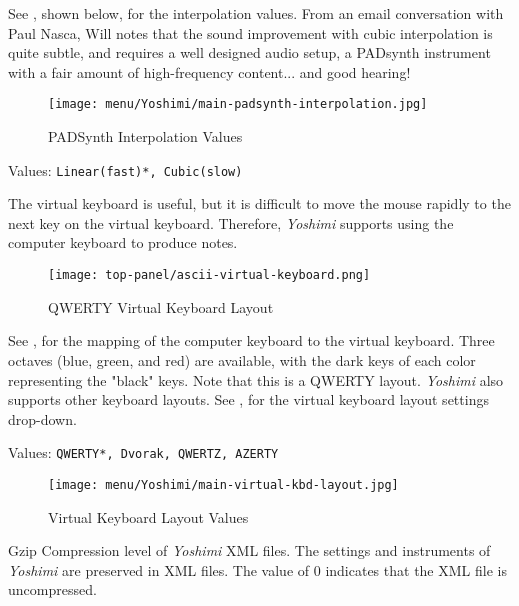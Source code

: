    See , shown below,
   for the interpolation values.
   From an email conversation with Paul Nasca, Will notes that
   the sound improvement with cubic interpolation is quite subtle, and requires
   a well designed audio setup, a PADsynth instrument with a fair amount of
   high-frequency content... and good hearing!

\begin{figure}[H]
   \centering
   \texttt{[image: menu/Yoshimi/main-padsynth-interpolation.jpg]}
   \caption[PADSynth Interpolation]{PADSynth Interpolation Values}
   \label{fig:padsynth_interpolation}
\end{figure}

   Values: \texttt{Linear(fast)*, Cubic(slow)}

   The virtual keyboard is useful, but it is difficult to move the mouse
   rapidly to the next key on the virtual keyboard.
   Therefore, \textsl{Yoshimi} supports using the computer keyboard
   to produce notes.

\begin{figure}[H]
   \centering
   \texttt{[image: top-panel/ascii-virtual-keyboard.png]}
   \caption{QWERTY Virtual Keyboard Layout}
   \label{fig:qwerty_virtual_keyboard}
\end{figure}

   See ,
   for the mapping of the computer keyboard to the
   virtual keyboard.
   Three octaves (blue, green, and red) are available, with the dark keys of
   each color representing the "black" keys.
   Note that this is a QWERTY layout.
   \textsl{Yoshimi} also supports other keyboard layouts.
   See ,
   for the virtual keyboard layout settings drop-down.

   Values: \texttt{QWERTY*, Dvorak, QWERTZ, AZERTY}

\begin{figure}[H]
   \centering
   \texttt{[image: menu/Yoshimi/main-virtual-kbd-layout.jpg]}
   \caption[Virtual Keyboard Layout]{Virtual Keyboard Layout Values}
   \label{fig:virtual_kbd_layout}
\end{figure}

   Gzip Compression level of \textsl{Yoshimi} XML files.
   The settings and instruments of
   \textsl{Yoshimi}
   are preserved in XML files.
   The value of 0 indicates that the XML file is uncompressed.

